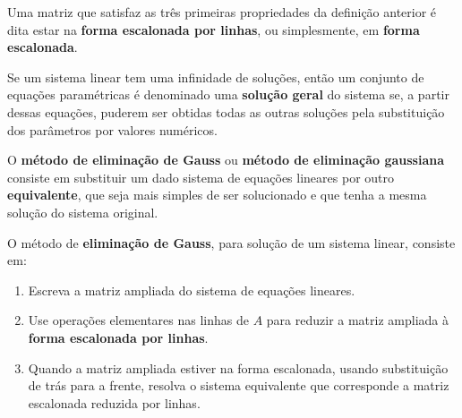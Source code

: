 \documentclass{beamer}
\begin{document}
    \begin{frame}
        \begin{observacao}
            Uma matriz que satisfaz as três primeiras propriedades da definição anterior \pause é dita estar na \textbf{forma escalonada por linhas}, \pause ou simplesmente, em \textbf{forma escalonada}.
        \end{observacao}
    \end{frame}


    \begin{frame}
        \begin{definicao}
            Se um sistema linear tem uma infinidade de soluções, \pause então um conjunto de equações paramétricas \pause é denominado uma \textbf{solução geral} \pause do sistema se, a partir dessas equações, \pause puderem ser obtidas todas as outras soluções \pause pela substituição dos parâmetros por valores numéricos.
        \end{definicao}
    \end{frame}

    \begin{frame}
        O \textbf{método de eliminação de Gauss} \pause ou \textbf{método de eliminação gaussiana} \pause consiste em substituir um dado sistema de equações lineares \pause por outro \textbf{equivalente}, que seja mais simples de ser solucionado \pause e que tenha a mesma solução do sistema original.\pause

        \begin{definicao}
            O método de \textbf{eliminação de Gauss}, \pause para solução de um sistema linear, \pause consiste em:\pause
            \begin{enumerate}[label={\roman*})]
                \item Escreva a matriz ampliada do sistema de equações lineares.\pause

                \item Use operações elementares nas linhas de $A$ para reduzir a matriz ampliada à \textbf{forma escalonada por linhas}.\pause

                \item Quando a matriz ampliada estiver na forma escalonada, usando substituição de trás para a frente, \pause resolva o sistema equivalente que corresponde a matriz escalonada reduzida por linhas.
            \end{enumerate}
        \end{definicao}
    \end{frame}
\end{document}

